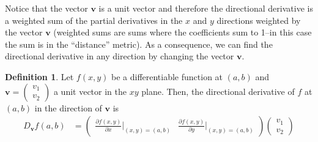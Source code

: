 \documentclass[
]{book}
\theoremstyle{definition}
\newtheorem{definition}{Definition}[chapter]
\theoremstyle{definition}
\theoremstyle{definition}
\theoremstyle{remark}
\begin{document}
Notice that the vector \(\mathbf{v}\) is a unit vector and therefore the directional derivative is a weighted sum of the partial derivatives in the \(x\) and \(y\) directions weighted by the vector \(\mathbf{v}\) (weighted sums are sums where the coefficients sum to 1--in this case the sum is in the ``distance'' metric). As a consequence, we can find the directional derivative in any direction by changing the vector \(\mathbf{v}\).

\begin{definition}
\protect\hypertarget{def:directional-gradient}{}{\label{def:directional-gradient} }Let \(f(x, y)\) be a differentiable function at \((a, b)\) and \(\mathbf{v} = \begin{pmatrix} v_1 \\ v_2 \end{pmatrix}\) a unit vector in the \(xy\) plane. Then, the directional derivative of \(f\) at \((a, b)\) in the direction of \(\mathbf{v}\) is
\[
\begin{aligned}
D_{\mathbf{v}} f(a, b) & = \begin{pmatrix} \frac{\partial f(x, y)}{\partial x}|_{(x,y) = (a, b)} & \frac{\partial f(x, y)}{\partial y}|_{(x,y) = (a, b)} \end{pmatrix} \begin{pmatrix} v_1 \\ v_2 \end{pmatrix} \\
\end{aligned}
\]
\end{definition}
\end{document}
